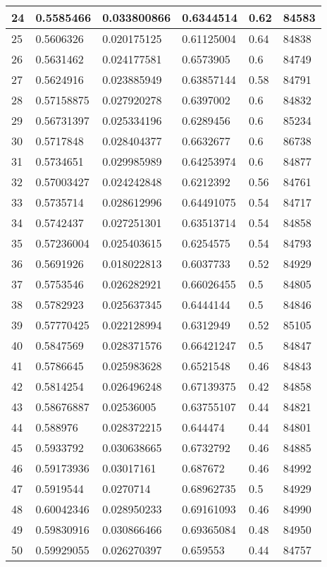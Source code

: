 \begin{longtable}{|l|l|l|l|l|l|}
24 & 0.5585466 & 0.033800866 & 0.6344514 & 0.62 & 84583 \\ \hline 
25 & 0.5606326 & 0.020175125 & 0.61125004 & 0.64 & 84838 \\ \hline 
26 & 0.5631462 & 0.024177581 & 0.6573905 & 0.6 & 84749 \\ \hline 
27 & 0.5624916 & 0.023885949 & 0.63857144 & 0.58 & 84791 \\ \hline 
28 & 0.57158875 & 0.027920278 & 0.6397002 & 0.6 & 84832 \\ \hline 
29 & 0.56731397 & 0.025334196 & 0.6289456 & 0.6 & 85234 \\ \hline 
30 & 0.5717848 & 0.028404377 & 0.6632677 & 0.6 & 86738 \\ \hline 
31 & 0.5734651 & 0.029985989 & 0.64253974 & 0.6 & 84877 \\ \hline 
32 & 0.57003427 & 0.024242848 & 0.6212392 & 0.56 & 84761 \\ \hline 
33 & 0.5735714 & 0.028612996 & 0.64491075 & 0.54 & 84717 \\ \hline 
34 & 0.5742437 & 0.027251301 & 0.63513714 & 0.54 & 84858 \\ \hline 
35 & 0.57236004 & 0.025403615 & 0.6254575 & 0.54 & 84793 \\ \hline 
36 & 0.5691926 & 0.018022813 & 0.6037733 & 0.52 & 84929 \\ \hline 
37 & 0.5753546 & 0.026282921 & 0.66026455 & 0.5 & 84805 \\ \hline 
38 & 0.5782923 & 0.025637345 & 0.6444144 & 0.5 & 84846 \\ \hline 
39 & 0.57770425 & 0.022128994 & 0.6312949 & 0.52 & 85105 \\ \hline 
40 & 0.5847569 & 0.028371576 & 0.66421247 & 0.5 & 84847 \\ \hline 
41 & 0.5786645 & 0.025983628 & 0.6521548 & 0.46 & 84843 \\ \hline 
42 & 0.5814254 & 0.026496248 & 0.67139375 & 0.42 & 84858 \\ \hline 
43 & 0.58676887 & 0.02536005 & 0.63755107 & 0.44 & 84821 \\ \hline 
44 & 0.588976 & 0.028372215 & 0.644474 & 0.44 & 84801 \\ \hline 
45 & 0.5933792 & 0.030638665 & 0.6732792 & 0.46 & 84885 \\ \hline 
46 & 0.59173936 & 0.03017161 & 0.687672 & 0.46 & 84992 \\ \hline 
47 & 0.5919544 & 0.0270714 & 0.68962735 & 0.5 & 84929 \\ \hline 
48 & 0.60042346 & 0.028950233 & 0.69161093 & 0.46 & 84990 \\ \hline 
49 & 0.59830916 & 0.030866466 & 0.69365084 & 0.48 & 84950 \\ \hline 
50 & 0.59929055 & 0.026270397 & 0.659553 & 0.44 & 84757 \\ \hline 
\end{longtable}